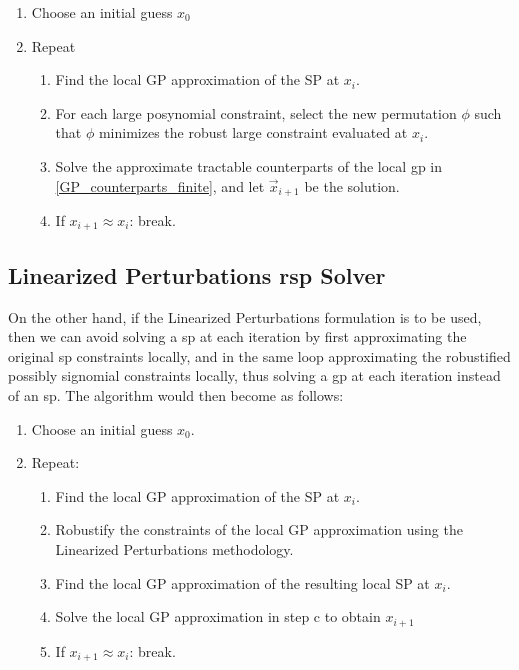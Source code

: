 \begin{enumerate}
    \item Choose an initial guess $x_0$
    \item Repeat
    \begin{enumerate}
        \item Find the local GP approximation of the SP at $x_i$.
        \item For each large posynomial constraint, select the new permutation $\phi$
                such that $\phi$ minimizes the robust large constraint evaluated at $x_i$.
        \item Solve the approximate tractable counterparts of the local \gls{gp} in
                \eqref{GP_counterparts_finite}, and let $\vec{x}_{i+1}$ be the solution.
        \item If $x_{i+1} \approx x_{i}$: break.
    \end{enumerate}
\end{enumerate}

\subsection{Linearized Perturbations \gls{rsp} Solver}

On the other hand, if the Linearized Perturbations formulation is to be used,
then we can avoid solving a \gls{sp} at each iteration by first
approximating the original \gls{sp} constraints locally, and in the same loop approximating
the robustified possibly signomial constraints locally, thus solving a
\gls{gp} at each iteration instead of an \gls{sp}. The algorithm would then become as follows:

\begin{enumerate}
    \item Choose an initial guess $x_0$.
    \item Repeat:
    \begin{enumerate}
        \item Find the local GP approximation of the SP at $x_i$.
        \item Robustify the constraints of the local GP approximation using the Linearized Perturbations methodology.
        \item Find the local GP approximation of the resulting local SP at $x_i$.
        \item Solve the local GP approximation in step c to obtain $x_{i+1}$
        \item If $x_{i+1} \approx x_{i}$: break.
    \end{enumerate}
\end{enumerate}
